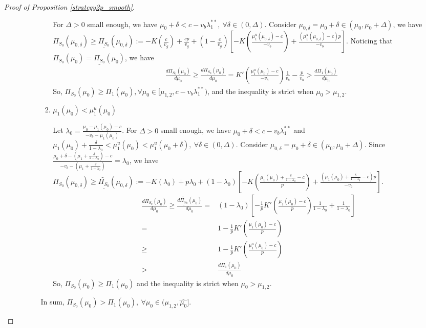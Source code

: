 \documentclass[11pt]{extarticle}
\begin{document}
\begin{proof}[Proof of Proposition \ref{strategy2p_smooth}]
\begin{enumerate}
\begin{enumerate}
\begin{enumerate}[i)]
\begin{enumerate}
					For $\Delta > 0$ small enough, we have $\mu_0 + \delta < c - v_b\lambda_1^{**},~\forall \delta \in (0,\Delta)$. Consider $\mu_{0,\delta} = \mu_0 + \delta \in (\mu_0, \mu_0 + \Delta)$, we have $\Pi_{S_0}(\mu_{0,\delta}) \geq \underline{\Pi_{S_0}}(\mu_{0,\delta}):=-K(\frac{c}{v_g})+\frac{cp}{v_g}+(1-\frac{c}{v_g})[-K(\frac{\mu_1^u(\mu_{0,\delta})-c}{-v_b})+\frac{(\mu_1^u(\mu_{0,\delta})-c)p}{-v_b}]$. Noticing that $\Pi_{S_0}(\mu_0) = \underline{\Pi_{S_0}}(\mu_0)$, we have
					\begin{align*}
					&\frac{d \Pi_{S_0}(\mu_0)}{d \mu_0}\geq \frac{d \underline{\Pi_{S_0}}(\mu_0)}{d \mu_0} = K'(\frac{\mu_1^u(\mu_0)-c}{-v_b})\frac{1}{v_b} - \frac{p}{v_b} > \frac{d \Pi_1(\mu_0)}{d \mu_0}		
					\end{align*}
					So, $\Pi_{S_0}(\mu_0) \geq \Pi_1(\mu_0), \forall \mu_0 \in [\mu_{1,2}, c - v_b\lambda_1^{**})$, and the inequality is strict when $\mu_0 > \mu_{1,2}$.
					
					\item $\mu_1(\mu_0) < \mu_1^u(\mu_0)$
					
					Let $\lambda_0 = \frac{\mu_0-\mu_1(\mu_0)-c}{-v_b-\mu_1(\mu_0)}$. For $\Delta > 0$ small enough, we have $\mu_0 + \delta < c - v_b\lambda_1^{**}$ and $\mu_1(\mu_0)+\frac{\delta}{1-\lambda_0} < \mu_1^u(\mu_0) < \mu_1^u(\mu_0+\delta),~\forall \delta \in (0,\Delta)$. Consider $\mu_{0,\delta} = \mu_0 + \delta \in (\mu_0, \mu_0 + \Delta)$. Since $\frac{\mu_0+\delta-(\mu_1+\frac{\delta}{1-\lambda_0})-c}{-v_b-(\mu_1+\frac{\delta}{1-\lambda_0})} = \lambda_0$, we have	$\Pi_{S_0}(\mu_{0,\delta}) \geq \underline{\widetilde{\Pi_{S_0}}}(\mu_{0,\delta}):= -K(\lambda_0)+p \lambda_0 +(1-\lambda_0)[-K(\frac{\mu_1(\mu_0)+\frac{\delta}{1-\lambda_0}-c}{p})+\frac{(\mu_1(\mu_0)+\frac{\delta}{1-\lambda_0}-c)p}{-v_b}]$.
					\vspace{-20pt}
					\begin{align*}
					\frac{d \Pi_{S_0}(\mu_0)}{d \mu_0}\geq \frac{d \underline{\widetilde{\Pi_{S_0}}}(\mu_0)}{d \mu_0} 
					=& (1-\lambda_0) \left[-\frac{1}{p}K'(\frac{\mu_1(\mu_0)-c}{p})\frac{1}{1-\lambda_0}+\frac{1}{1-\lambda_0}\right]\\  =&1-\frac{1}{p}K'(\frac{\mu_1(\mu_0)-c}{p})\\ \geq& 1-\frac{1}{p}K'(\frac{\mu_1^u(\mu_0)-c}{p})\\
					>& \frac{d \Pi_1(\mu_0)}{d \mu_0}
					\end{align*}
					So, $\Pi_{S_0}(\mu_0) \geq \Pi_1(\mu_0)$ and the inequality is strict when $\mu_0 > \mu_{1,2}$.
				\end{enumerate}
				In sum, $\Pi_{S_0}(\mu_0) > \Pi_1(\mu_0),~\forall \mu_0 \in (\mu_{1,2}, \widehat{\mu_0}]$.
			\end{enumerate}
			

\end{enumerate}
\end{enumerate}
\end{proof}
\end{document}
